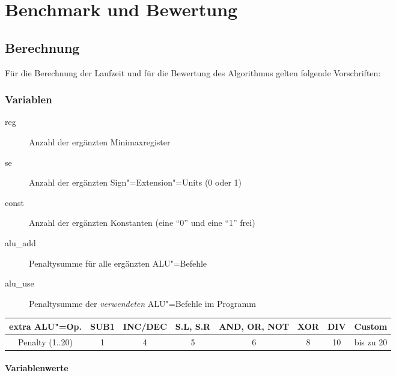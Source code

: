 \chapter{Benchmark und Bewertung}
\label{chapter:Dokumentation-BenchmarkBewertung}

\section{Berechnung}
\label{section:Dokumentation-BenchmarkBewertung-Berechnung}

Für die Berechnung der Laufzeit und für die Bewertung des Algorithmus gelten folgende Vorschriften:

\subsection{Variablen}
\label{subsection:Dokumentation-BenchmarkBewertung-Berechnung-Variablen}

\begin{description}
    \item[reg] Anzahl der ergänzten Minimaxregister
    \item[se] Anzahl der ergänzten Sign"=Extension"=Units (0 oder 1)
    \item[const] Anzahl der ergänzten Konstanten (eine "`0"' und eine "`1"' frei)
    \item[alu\_add] Penaltysumme für alle ergänzten ALU"=Befehle
    \item[alu\_use] Penaltysumme der \emph{verwendeten} ALU"=Befehle im Programm
\end{description}

\begin{center}
    \begin{tabular}{|c||c|c|c|c|c|c|c|}
        \hline
        extra ALU"=Op. & SUB1 & INC/DEC & S.L, S.R & AND, OR, NOT & XOR & DIV & Custom \\ 
        \hline
        Penalty (1..20) & 1 & 4 & 5 & 6 & 8 & 10 & bis zu 20 \\
        \hline
    \end{tabular}
\end{center}

\subsubsection{Variablenwerte}
\label{subsubsection:Dokumentation-BenchmarkBewertung-Berechnung-Variablen-Variablenwerte}

